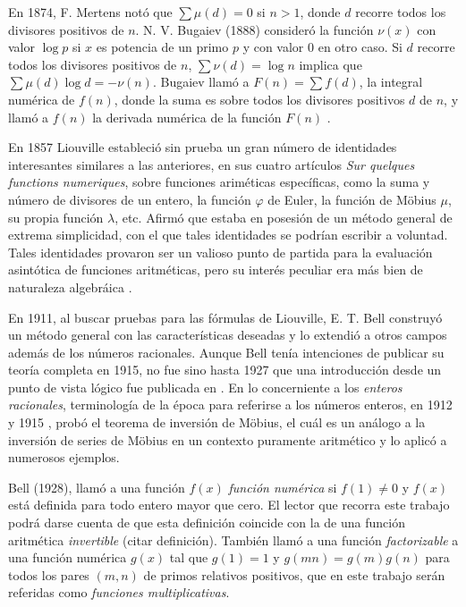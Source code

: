 En 1874, F. Mertens notó que $\sum \mu(d) = 0$ si $n>1$, donde $d$ recorre todos los divisores positivos de $n$.
N. V. Bugaiev (1888) consideró la función $\nu(x)$ con valor $\log p$ si $x$ es potencia de un primo $p$ y con valor 0 en otro caso. Si $d$ recorre todos los divisores positivos de $n$, $\sum \nu(d) = \log n$ implica que $\sum \mu(d) \log d = -\nu(n)$. Bugaiev llamó a $F(n) = \sum f(d)$, la integral numérica de $f(n)$, donde la suma es sobre todos los divisores positivos $d$ de $n$, y llamó a $f(n)$ la derivada numérica de la función $F(n)$ \cite{Di1}.
\newpage
\thispagestyle{easter3}

En 1857 Liouville estableció sin prueba un gran número de identidades interesantes similares a las anteriores, en sus cuatro artículos \emph{Sur quelques functions numeriques}, sobre funciones ariméticas específicas, como la suma y número de divisores de un entero, la función $\varphi$ de Euler, la función de Möbius $\mu$, su propia función $\lambda$, etc. Afirmó que estaba en posesión de un método general de extrema simplicidad, con el que tales identidades se podrían escribir a voluntad. Tales identidades provaron ser un valioso punto de partida para la evaluación asintótica de funciones aritméticas, pero su interés peculiar era más bien  de naturaleza algebráica \cite{Bell1}. 
\bigskip

En 1911, al buscar pruebas para las fórmulas de Liouville, E. T. Bell construyó un método general con las características deseadas y lo extendió a otros campos además de los números racionales. Aunque Bell tenía intenciones de publicar su teoría completa en 1915, no fue sino hasta 1927 que una introducción desde un punto de vista lógico fue publicada en \cite{Bell2}. En lo concerniente a los \textit{enteros racionales}, terminología de la época para referirse a los números enteros, en 1912 y 1915 \cite{Bell1}, probó el teorema de inversión de Möbius, el cuál es un análogo a la inversión de series de Möbius en un contexto puramente aritmético y lo aplicó a numerosos ejemplos.
\bigskip

Bell (1928), llamó a una función $f(x)$ \emph{función numérica} si $f(1) \ne 0$ y $f(x)$ está definida para todo entero mayor que cero. El lector que recorra este trabajo podrá darse cuenta de que esta definición coincide con la de una función aritmética \emph{invertible} (\textsf{citar definición}). También llamó a una función \emph{factorizable} a una función numérica $g(x)$ tal que $g(1)=1$ y $g(m n)=g(m)g(n)$ para todos los pares $(m,n)$ de primos relativos positivos, que en este trabajo serán referidas como \emph{funciones multiplicativas}.
\bigskip

